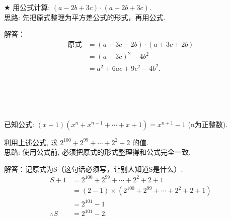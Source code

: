 \begin{comment}
\item {
    多项式 $4a^2+9$ 加上一个单项式后, 可化为一个多项式的平方, 求这个单项式.
    \\ \\ \\
}
\end{comment}

\begin{comment}
\item {
    已知 $a^2+a-1=0$, 求 $a^3 + 2a^2 + 2023$ 的值.
    \\ \\ \\
}
\end{comment}

\item {
    $\bigstar$
    用公式计算: $(a-2b+3c)\cdot (a+2b+3c)$.
    \ifshowSolution
    \fangsong{}
    \\
    思路: 先把原式整理为平方差公式的形式，再用公式.

    解答：
    \begin{align*}
        \mbox{原式} &= (a+3c-2b)\cdot (a+3c+2b) \\
        &= (a+3c)^2 - 4b^2 \\
        &= a^2 + 6ac + 9c^2 - 4b^2. \\
    \end{align*}

    \else
        \\ \\ \\
    \fi
}

\item {
    已知公式: $(x-1)(x^n + x^{n-1} + \cdots + x + 1) = x^{n+1} - 1$ (n为正整数).
    
    利用上述公式, 求 $2^{100} + 2^{99} +\cdots + 2^2 + 2$ 的值.
    \ifshowSolution
        \fangsong{}
        \\
        思路: 使用公式前, 必须把原式的形式整理得和公式完全一致.

        解答：记原式为S（这句话必须写，让别人知道S是什么）.
        \begin{align*}
            S + 1 &= 2^{100} + 2^{99} + \cdots + 2^2 + 2 + 1 \\
            &= (2-1)\times (2^{100} + 2^{99} + \cdots + 2^2 + 2 + 1) \\
            &= 2^{101} - 1 \\
            \therefore
            S &= 2^{101} - 2.
        \end{align*}
    \else
        \\ \\ \\
    \fi
}

